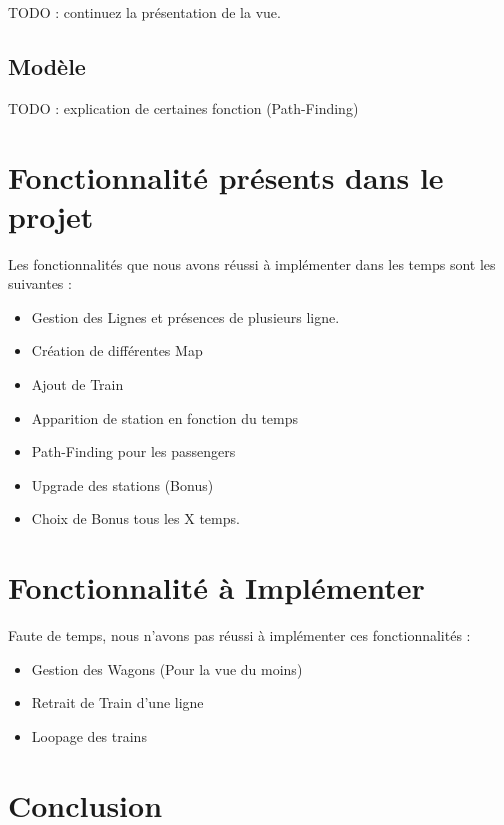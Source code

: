 \documentclass[report, backcover, french, nodocumentinfo]{upmethodology-document}
\begin{document}
			TODO : continuez la présentation de la vue.
		\section{Modèle}
			TODO : explication de certaines fonction (Path-Finding)
	\chapter{Fonctionnalité présents dans le projet}
		\p{}
		Les fonctionnalités que nous avons réussi à implémenter dans les temps sont les suivantes : 
		\begin{itemize}
			\item Gestion des Lignes et présences de plusieurs ligne.
			\item Création de différentes Map
			\item Ajout de Train
			\item Apparition de station en fonction du temps
			\item Path-Finding pour les passengers
			\item Upgrade des stations (Bonus)
			\item Choix de Bonus tous les X temps.
		\end{itemize}
	\chapter{Fonctionnalité à Implémenter}
		\p{}
		Faute de temps, nous n'avons pas réussi à implémenter ces fonctionnalités : 
		\begin{itemize}
			\item Gestion des Wagons (Pour la vue du moins)
			\item Retrait de Train d'une ligne
			\item Loopage des trains
		\end{itemize}
	\chapter{Conclusion}
		\p{}
\end{document}
